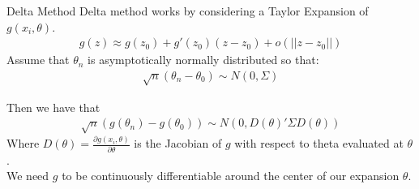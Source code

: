 \begin{frame}{Delta Method}
  Delta method works by considering a \alert{Taylor Expansion} of $g(x_i,\theta)$.
  \begin{eqnarray*}
  g(z) \approx g(z_0) + g'(z_0)(z-z_0) + o(||z-z_0||)
  \end{eqnarray*}
  Assume that $\theta_n$ is asymptotically normally distributed so that:
  \begin{eqnarray*}
  \sqrt{n} (\theta_n - \theta_0) \sim N(0,\Sigma)
  \end{eqnarray*}
  
  Then we have that 
  \begin{eqnarray*}
  \sqrt{n} (g(\theta_n) - g(\theta_0)) \sim N(0,D(\theta)' \Sigma  D(\theta))
  \end{eqnarray*}
  Where $D(\theta) = \frac{\partial g(x_i, \theta)}{\partial \theta}$ is the Jacobian of $g$ with respect to theta evaluated at $\theta$.\\
  We need $g$ to be continuously differentiable around the center of our expansion $\theta$.
\end{frame}
  
